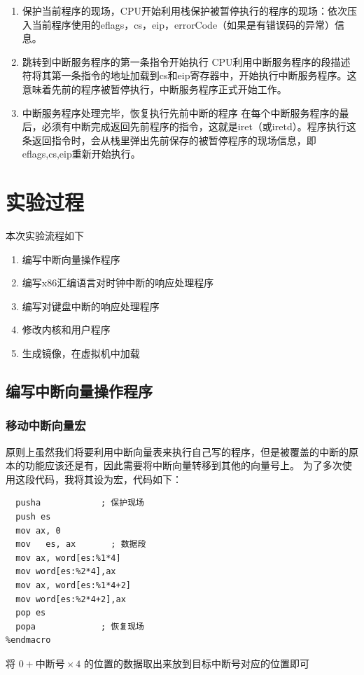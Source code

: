 \documentclass[a4paper, 11pt]{article} %
\begin{document}
\begin{enumerate}
  \item 保护当前程序的现场，CPU开始利用栈保护被暂停执行的程序的现场：依次压入当前程序使用的eflags，cs，eip，errorCode（如果是有错误码的异常）信息。
  \item 跳转到中断服务程序的第一条指令开始执行
  CPU利用中断服务程序的段描述符将其第一条指令的地址加载到cs和eip寄存器中，开始执行中断服务程序。这意味着先前的程序被暂停执行，中断服务程序正式开始工作。
  
  \item 中断服务程序处理完毕，恢复执行先前中断的程序
  在每个中断服务程序的最后，必须有中断完成返回先前程序的指令，这就是iret（或iretd）。程序执行这条返回指令时，会从栈里弹出先前保存的被暂停程序的现场信息，即eflags,cs,eip重新开始执行。
\end{enumerate}



\section{实验过程}

本次实验流程如下
\begin{enumerate}
  \item 编写中断向量操作程序
  \item 编写x86汇编语言对时钟中断的响应处理程序
  \item 编写对键盘中断的响应处理程序
  \item 修改内核和用户程序
  \item 生成镜像，在虚拟机中加载
\end{enumerate}

\subsection{编写中断向量操作程序}

\subsubsection{移动中断向量宏}
原则上虽然我们将要利用中断向量表来执行自己写的程序，但是被覆盖的中断的原本的功能应该还是有，因此需要将中断向量转移到其他的向量号上。
为了多次使用这段代码，我将其设为宏，代码如下：
\begin{lstlisting}[language={[x86masm]Assembler},label=MOVE VECTOR,caption=MOVE\_VECTOR]
  %macro MOVE_VECTOR 2
  pusha            ; 保护现场
  push es
  mov ax, 0
  mov	es, ax       ; 数据段
  mov ax, word[es:%1*4]
  mov word[es:%2*4],ax
  mov ax, word[es:%1*4+2]
  mov word[es:%2*4+2],ax
  pop es
  popa             ; 恢复现场
%endmacro
\end{lstlisting}
将 $ 0+\text{中断号}\times 4 $ 的位置的数据取出来放到目标中断号对应的位置即可
\end{document}

